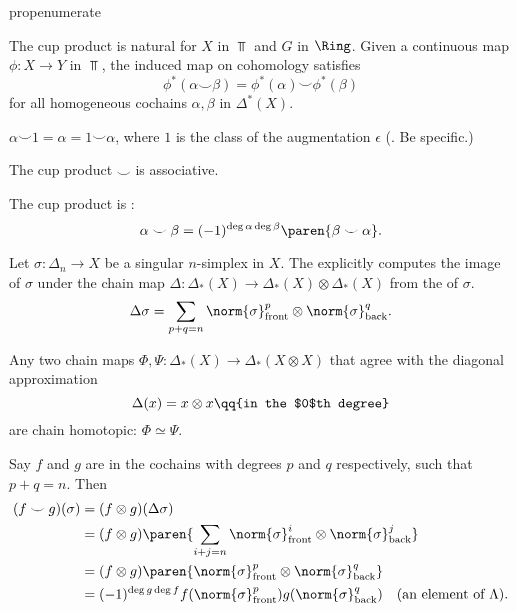 \begin{comp}{prop}{enumerate}
    \item The cup product is natural for $X$ in $\Top$ and $G$ in $\Ring$. Given a continuous map $\phi \colon X \to Y$ in $\Top$, the induced map on cohomology satisfies 
       \[
       \phi^*(\alpha \smile \beta) = \phi^*(\alpha) \smile \phi^*(\beta)
       \]
       for all homogeneous cochains $\alpha, \beta$ in $\Delta^*(X)$.
    \item $\alpha \smile 1 = \alpha = 1 \smile \alpha$, where $1$ is the class of the augmentation $\epsilon$ (\TODO. Be specific.)
    \item The cup product $\smile$ is associative.
    \item The cup product is :
       \[\alpha \smile \beta = (-1)^{\deg \alpha \deg \beta} \paren{ \beta \smile \alpha }. \] 
\end{comp}

\begin{defn}
   Let $\sigma \colon \Delta_n \to X$ be a singular $n$-simplex in $X$. The  explicitly computes the image of $\sigma$ under the chain map $\Delta \colon \Delta_*(X) \to \Delta_*(X) \otimes \Delta_*(X)$ from the  of $\sigma$.
   \[
       \Delta \sigma  = \sum_{p + q = n} \norm{ \sigma }_\text{front}^p \otimes \norm{ \sigma }_\text{back}^q
   .\]
\end{defn}

\begin{todo}
   Any two chain maps $\Phi, \Psi \colon \Delta_*(X) \to \Delta_*(X\otimes X)$ that agree with the diagonal approximation
    \[
        \Delta(x) = x \otimes x \qq{in the $0$th degree}
    \]
    are chain homotopic: $\Phi \simeq \Psi$.
\end{todo}

\begin{prop}
    Say $f$ and $g$ are in the cochains with degrees $p$ and $q$ respectively, such that $p+q = n$. Then
    \begin{align*}
        (f \smile g)(\sigma) &= (f \otimes g)(\Delta\sigma)\\
                           &= (f \otimes g) \paren{\sum_{i+j = n} \norm{ \sigma }_\text{front}^i \otimes \norm{ \sigma }_\text{back}^j} \\
                           &= (f \otimes g) \paren{ \norm{ \sigma }_\text{front}^p \otimes \norm{ \sigma }_\text{back}^q}  \\
                           & = (-1)^{\deg g \deg f} f(  \norm{ \sigma }_\text{front}^p ) g(\norm{ \sigma }_\text{back}^q) \quad (\text{an element of } \Lambda).
    \end{align*}
\end{prop}

